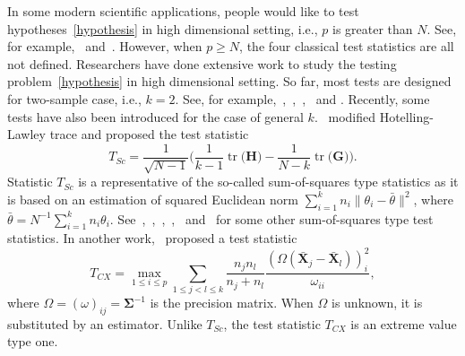 \documentclass[12pt]{article} %
\DeclareMathOperator{\mytr}{tr}
\newcommand{\bX}{\mathbf{X}}
\newcommand{\bH}{\mathbf{H}}
\newcommand{\bG}{\mathbf{G}}
\newcommand{\bfsym}[1]{\ensuremath{\boldsymbol{#1}}}
\def\bSigma {\bfsym {\Sigma}}
\theoremstyle{definition}
\begin{document}
In some modern scientific applications, people would like to test hypotheses~\eqref{hypothesis} in high dimensional setting, i.e., $p$ is greater than $N$.
See, for example,~\citet{Verstynen1209} and~\citet{Tsai2009}.
However, when $p\geq N$, the four classical test statistics are all not defined.
  Researchers have done extensive work to study the testing problem~\eqref{hypothesis} in high dimensional setting.
 So far, most tests are designed for two-sample case, i.e., $k=2$.
  See, for example,~\citet{Bai1996Efiect},~\cite{Srivastava2007Multivariate},~\citet{Chen2010A},~\citet{Tony2013} and \citet{Feng2014Two}.
  Recently, some tests have also been introduced for the case of general $k$.~\cite{Schott2007Some} modified Hotelling-Lawley trace and proposed the test statistic
  $$
  T_{Sc}=\frac{1}{\sqrt{N-1}}\Big(
  \frac{1}{k-1}\mytr\big(\bH\big)-\frac{1}{N-k}\mytr\big(\bG\big)
  \Big).
  $$
Statistic $T_{Sc}$ is a representative of the so-called sum-of-squares type statistics as it is based on an estimation of squared Euclidean norm $\sum_{i=1}^k n_i\|\theta_i-\bar{\theta}\|^2$, where $\bar{\theta}=N^{-1}\sum_{i=1}^k n_i \theta_i$.
See~\cite{Srivastava2013},~\cite{Hu2017},~\cite{Yamada2015},~\cite{ZHANG2017200},~\cite{Chang2017} and~\cite{2017arXiv171007878C} for some other sum-of-squares type test statistics.
In another work,~\cite{Cai2014High} proposed a test statistic 
  $$
  T_{CX}=\max_{1\leq i\leq p} \sum_{1\leq j<l\leq k}\frac{n_j n_l}{n_j+n_l}\frac{(\Omega(\bar{\bX}_j-\bar{\bX}_l))_i^2}{\omega_{ii}},
  $$
  where $\Omega=(\omega)_{ij}=\bSigma^{-1}$ is the precision matrix. When $\Omega$ is unknown, it is substituted by an estimator.
  Unlike $T_{Sc}$, the test statistic $T_{CX}$ is an extreme value type one.
  
\end{document}
